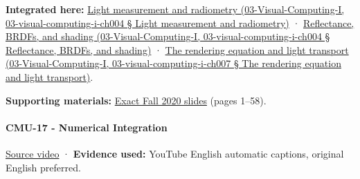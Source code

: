 \textbf{Integrated here:} \href{}{Light measurement and radiometry (03-Visual-Computing-I, 03-visual-computing-i-ch004 § Light measurement and radiometry)} · \href{}{Reflectance, BRDFs, and shading (03-Visual-Computing-I, 03-visual-computing-i-ch004 § Reflectance, BRDFs, and shading)} · \href{}{The rendering equation and light transport (03-Visual-Computing-I, 03-visual-computing-i-ch007 § The rendering equation and light transport)}.

\textbf{Supporting materials:} \href{https://15462.courses.cs.cmu.edu/fall2020content/lectures/16_renderingequation/16_renderingequation_slides.pdf}{Exact Fall 2020 slides} (pages 1--58).

\paragraph{CMU-17 - Numerical Integration}\label{cmu-17---numerical-integration}

\href{https://www.youtube.com/watch?v=EGNZm9m382s}{Source video} · \textbf{Evidence used:} YouTube English automatic captions, original English preferred.

